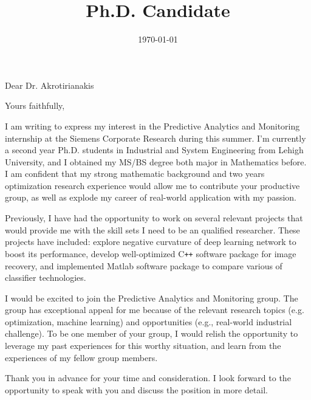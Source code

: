 \documentclass[11pt,a4paper,sans]{moderncv}        %
\title{Ph.D. Candidate}                               %
\begin{document}
\date{\today}
\opening{Dear Dr. Akrotirianakis}
\closing{Yours faithfully,}
\makelettertitle

I am writing to express my interest in the Predictive Analytics and Monitoring internship at the
Siemens Corporate Research during this summer. I'm currently a second year Ph.D. students in Industrial and System Engineering from Lehigh University, 
and I obtained my MS/BS degree both major in Mathematics before. I am confident that my strong mathematic background and two years 
optimization research experience would allow me to contribute your productive group, as well as explode my career of real-world application with my passion.

Previously, I have had the opportunity to work on several relevant projects that would provide me with
the skill sets I need to be an qualified researcher. These projects have included: explore negative 
curvature of deep learning network to boost its performance, develop well-optimized C\texttt{++} software 
package for image recovery, and implemented Matlab software package to compare various of classifier technologies.

I would be excited to join the Predictive Analytics and Monitoring group. The group has exceptional appeal for me
because of the relevant research topics (e.g. optimization, machine learning) and opportunities (e.g., real-world industrial challenge). 
To be one member of your group, I would relish the opportunity to leverage my past
experiences for this worthy situation, and learn from the experiences of my fellow group members.

Thank you in advance for your time and consideration.  I look forward to the opportunity to speak with you and discuss the
position in more detail.

\makeletterclosing
\end{document}
